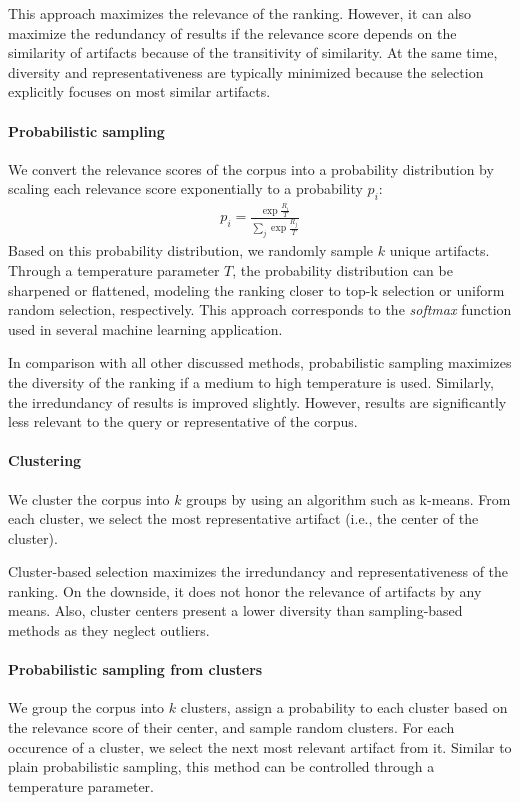 This approach maximizes the relevance of the ranking.
However, it can also maximize the redundancy of results if the relevance score depends on the similarity of artifacts because of the transitivity of similarity.
At the same time, diversity and representativeness are typically minimized because the selection explicitly focuses on most similar artifacts.

\paragraph{Probabilistic sampling}
We convert the relevance scores of the corpus into a probability distribution by scaling each relevance score exponentially to a probability $p_i$:
\begin{align}
	p_i = \frac{\exp \frac{R_i}{T}}{\sum_j \exp \frac{R_j}{T}}
\end{align}
Based on this probability distribution, we randomly sample $k$ unique artifacts.
Through a temperature parameter $T$, the probability distribution can be sharpened or flattened, modeling the ranking closer to top-k selection or uniform random selection, respectively.
This approach corresponds to the \emph{softmax} function used in several machine learning application.

In comparison with all other discussed methods, probabilistic sampling maximizes the diversity of the ranking if a medium to high temperature is used.
Similarly, the irredundancy of results is improved slightly.
However, results are significantly less relevant to the query or representative of the corpus.

\paragraph{Clustering}
We cluster the corpus into $k$ groups by using an algorithm such as k-means.
From each cluster, we select the most representative artifact (i.e., the center of the cluster).

Cluster-based selection maximizes the irredundancy and representativeness of the ranking.
On the downside, it does not honor the relevance of artifacts by any means.
Also, cluster centers present a lower diversity than sampling-based methods as they neglect outliers.

\paragraph{Probabilistic sampling from clusters}
We group the corpus into $k$ clusters, assign a probability to each cluster based on the relevance score of their center, and sample random clusters.
For each occurence of a cluster, we select the next most relevant artifact from it.
Similar to plain probabilistic sampling, this method can be controlled through a temperature parameter.

